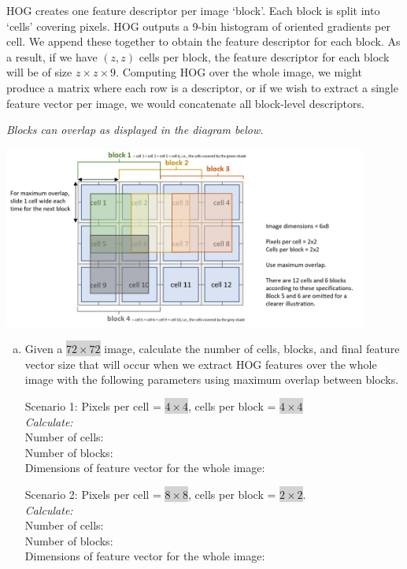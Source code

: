 HOG creates one feature descriptor per image `block'. Each block is split into `cells' covering pixels. HOG outputs a 9-bin histogram of oriented gradients per cell. We append these together to obtain the feature descriptor for each block. As a result, if we have $(z,z)$ cells per block, the feature descriptor for each block will be of size $z \times z \times 9$. Computing HOG over the whole image, we might produce a matrix where each row is a descriptor, or if we wish to extract a single feature vector per image, we would concatenate all block-level descriptors.

\emph{Blocks can overlap as displayed in the diagram below.}
%
\begin{center}
    \includegraphics[clip, trim = {0.2cm, 0.35cm, 0.2cm, 0.2cm}, width=12cm]{hog-diagram.png}
\end{center}


\begin{enumerate}[(a)]
\item Given a \colorbox{lightgray}{$72\times72$} image, calculate the number of cells, blocks, and final feature vector size that will occur when we extract HOG features over the whole image with the following parameters using maximum overlap between blocks.

Scenario 1: Pixels per cell = \colorbox{lightgray}{$4\times4$}, cells per block = \colorbox{lightgray}{$4\times4$} %
\\
\emph{Calculate:}
\\ 
Number of cells: 
\\
Number of blocks: 
\\
Dimensions of feature vector for the whole image: 
\\

\vspace{-0.35cm}

Scenario 2: Pixels per cell = \colorbox{lightgray}{$8\times8$}, cells per block = \colorbox{lightgray}{$2\times2$}.
\\
\emph{Calculate:}
\\ 
Number of cells:
\\
Number of blocks: 
\\
Dimensions of feature vector for the whole image: 
\end{enumerate}
%

